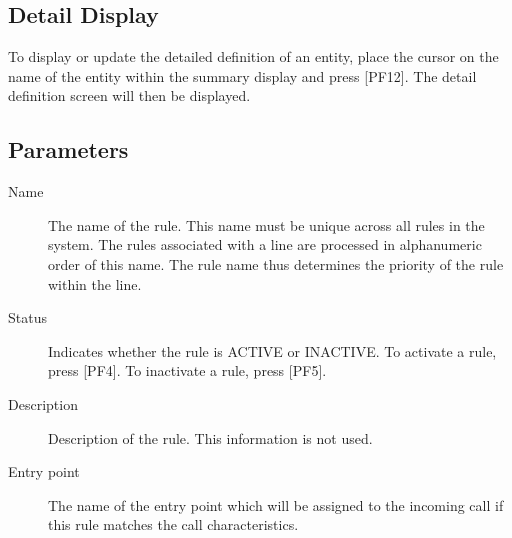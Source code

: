\documentclass[letterpaper,10pt,english]{sphinxmanual}
\begin{document}

\subsection{Detail Display}
\label{\detokenize{connectivity_guide:id46}}\label{\detokenize{connectivity_guide:index-92}}
To display or update the detailed definition of an entity, place the cursor on the name of the entity within the summary display and press {[}PF12{]}. The detail definition screen will then be displayed.



\subsection{Parameters}
\label{\detokenize{connectivity_guide:id47}}\label{\detokenize{connectivity_guide:index-93}}\begin{description}
\item[{Name}] \leavevmode
The name of the rule. This name must be unique across all rules in the system. The rules associated with a line are processed in alphanumeric order of this name. The rule name thus determines the priority of the rule within the line.

\item[{Status}] \leavevmode
Indicates whether the rule is ACTIVE or INACTIVE. To activate a rule, press {[}PF4{]}. To inactivate a rule, press {[}PF5{]}.

\item[{Description}] \leavevmode
Description of the rule. This information is not used.

\item[{Entry point}] \leavevmode
The name of the entry point which will be assigned to the incoming call if this rule matches the call characteristics.

\end{description}
\end{document}

